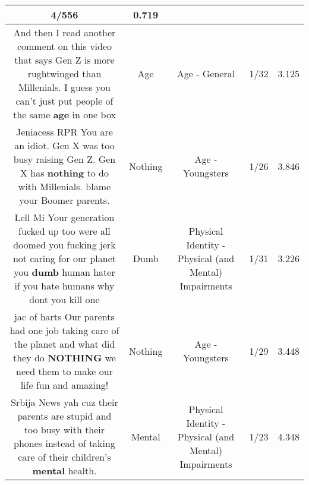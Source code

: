 \documentclass[11pt]{article}
\newlength\mylength
\begin{document}
\begin{center}
\begin{longtable}{|C{.65\mylength}|C{.30\mylength}|C{.12\mylength}|C{.12\mylength}|C{.12\mylength}|}
4/556 & 0.719 \\  \hline
  \small And then I read another comment on this video that says Gen Z is more rughtwinged than Millenials. I guess you can't just put people of the same \textbf{age} in one box\normalsize   & Age & Age - General & 1/32 & 3.125 \\  \hline
  \small Jeniacess RPR You are an idiot. Gen X was too busy raising Gen Z. Gen X has \textbf{nothing} to do with Millenials. blame your Boomer parents.\normalsize   & Nothing & Age - Youngsters & 1/26 & 3.846 \\  \hline
  \small Lell Mi Your generation fucked up too were all doomed you fucking jerk not caring for our planet you \textbf{dumb} human hater if you hate humans why dont you kill one\normalsize   & Dumb & Physical Identity - Physical (and Mental) Impairments & 1/31 & 3.226 \\  \hline
  \small jac of harts Our parents had one job taking care of the planet and what did they do \textbf{NOTHING} we need them to make our life fun and amazing!\normalsize   & Nothing & Age - Youngsters & 1/29 & 3.448 \\  \hline
  \small Srbija News yah cuz their parents are stupid and too busy with their phones instead of taking care of their children's \textbf{mental} health.\normalsize   & Mental & Physical Identity - Physical (and Mental) Impairments & 1/23 & 4.348 \\  \hline

\end{longtable}
\end{center}
\end{document}
